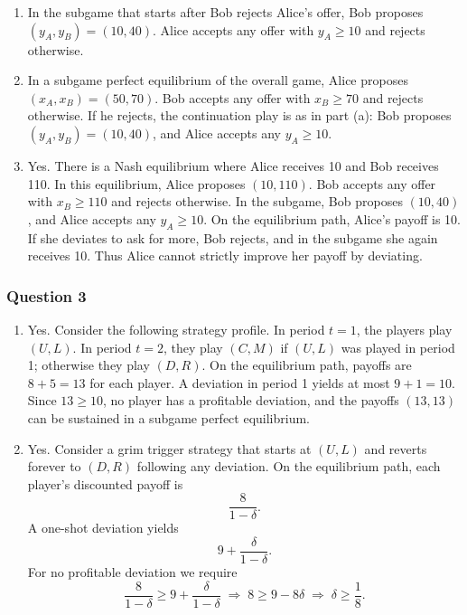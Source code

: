 \documentclass[12pt,a4paper]{article}
\begin{document}
\begin{enumerate}
  \item In the subgame that starts after Bob rejects Alice's offer, Bob proposes \((y_A, y_B) = (10, 40)\). Alice accepts any offer with \(y_A \ge 10\) and rejects otherwise.

  \item In a subgame perfect equilibrium of the overall game, Alice proposes \((x_A, x_B) = (50, 70)\). Bob accepts any offer with \(x_B \ge 70\) and rejects otherwise. If he rejects, the continuation play is as in part (a): Bob proposes \((y_A, y_B) = (10, 40)\), and Alice accepts any \(y_A \ge 10\).

  \item Yes. There is a Nash equilibrium where Alice receives 10 and Bob receives 110. In this equilibrium, Alice proposes \((10, 110)\). Bob accepts any offer with \(x_B \ge 110\) and rejects otherwise. In the subgame, Bob proposes \((10, 40)\), and Alice accepts any \(y_A \ge 10\). On the equilibrium path, Alice's payoff is 10. If she deviates to ask for more, Bob rejects, and in the subgame she again receives 10. Thus Alice cannot strictly improve her payoff by deviating.
\end{enumerate}

\subsubsection*{Question 3}

\begin{enumerate}
  \item Yes. Consider the following strategy profile. In period \(t=1\), the players play \((U,L)\). In period \(t=2\), they play \((C,M)\) if \((U,L)\) was played in period 1; otherwise they play \((D,R)\). On the equilibrium path, payoffs are \(8+5 = 13\) for each player. A deviation in period 1 yields at most \(9+1 = 10\). Since \(13 \ge 10\), no player has a profitable deviation, and the payoffs \((13,13)\) can be sustained in a subgame perfect equilibrium.

  \item Yes. Consider a grim trigger strategy that starts at \((U,L)\) and reverts forever to \((D,R)\) following any deviation. On the equilibrium path, each player's discounted payoff is
        \[
          \frac{8}{1-\delta}.
        \]
        A one-shot deviation yields
        \[
          9 + \frac{\delta}{1-\delta}.
        \]
        For no profitable deviation we require
        \[
          \frac{8}{1-\delta} \ge 9 + \frac{\delta}{1-\delta}
          \;\Longrightarrow\;
          8 \ge 9 - 8\delta
          \;\Longrightarrow\;
          \delta \ge \frac{1}{8}.
        \]
\end{enumerate}
\end{document}
